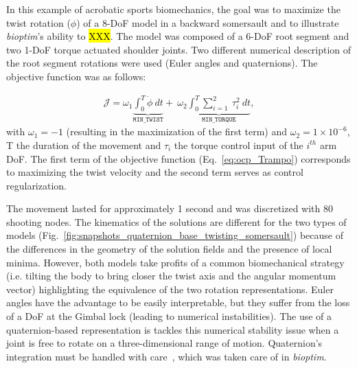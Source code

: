 In this example of acrobatic sports biomechanics, the goal was to maximize the twist rotation ($\phi$) of a 8-DoF model in a backward somersault and to illustrate \textit{bioptim}'s ability to \hl{XXX}.
The model was composed of a 6-DoF root segment and two 1-DoF torque actuated shoulder joints.
Two different numerical description of the root segment rotations were used (Euler angles and quaternions).
The objective function was as follows:

\begin{eqnarray}\label{eq:ocp_Trampo}
\mathcal{J} = \omega_1 \underbrace{\int_0^T \dot{\phi}~dt}_{\mathtt{MIN\_TWIST}}  +~\omega_2 \underbrace{\int_0^T \sum_{i=1}^{2}~\tau_{i}^2~dt}_{\mathtt{MIN\_ TORQUE}},
\end{eqnarray}
with $\omega_1 = -1$ (resulting in the maximization of the first term) and $\omega_2 = 1\times 10^{-6}$, T the duration of the movement and $\tau_{i}$ the torque control input of the $i^{th}$ arm DoF.
The first term of the objective function (Eq.~\ref{eq:ocp_Trampo}) corresponds to maximizing the twist velocity and the second term serves as control regularization.


The movement lasted for approximately 1 second and was discretized with 80 shooting nodes.
The kinematics of the solutions are different for the two types of models (Fig.~\ref{fig:snapshots_quaternion_base_twisting_somersault}) because of the differences in the geometry of the solution fields and the presence of local minima.
However, both models take profits of a common biomechanical strategy (i.e. tilting the body to bring closer the twist axis and the angular momentum vector) highlighting the equivalence of the two rotation representations.
Euler angles have the advantage to be easily interpretable, but they suffer from the loss of a DoF at the Gimbal lock (leading to numerical instabilities).
The use of a quaternion-based representation is tackles this numerical stability issue when a joint is free to rotate on a three-dimensional range of motion.
Quaternion's integration must be handled with care~\cite{bailly2020optimal}, which was taken care of in \textit{bioptim}.


